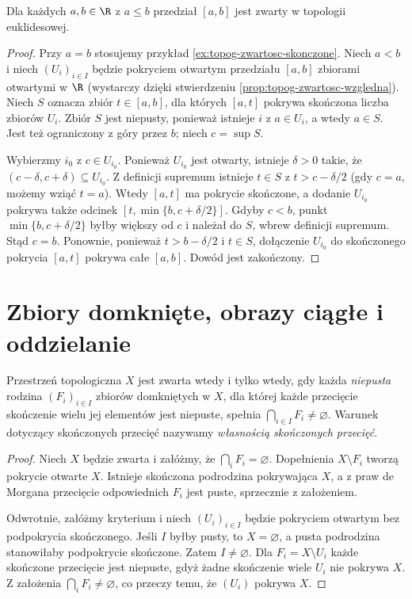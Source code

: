 \begin{twierdzenie}
\label{thm:topog-zwartosc-odcinek}
Dla każdych $a,b\in\R$ z $a\le b$ przedział $[a,b]$
jest zwarty w topologii euklidesowej.
\end{twierdzenie}
\begin{proof}
Przy $a=b$ stosujemy przykład
\ref{ex:topog-zwartosc-skonczone}. Niech $a<b$
i niech $(U_i)_{i\in I}$ będzie pokryciem
otwartym przedziału $[a,b]$ zbiorami otwartymi
w $\R$ (wystarczy dzięki stwierdzeniu
\ref{prop:topog-zwartosc-wzgledna}).
Niech $S$ oznacza zbiór $t\in[a,b]$, dla których
$[a,t]$ pokrywa skończona liczba zbiorów $U_i$.
Zbiór $S$ jest niepusty, ponieważ istnieje $i$
z $a\in U_i$, a wtedy $a\in S$.
Jest też ograniczony z góry przez $b$; niech $c=\sup S$.

Wybierzmy $i_0$ z $c\in U_{i_0}$. Ponieważ $U_{i_0}$
jest otwarty, istnieje $\delta>0$ takie, że
$(c-\delta,c+\delta)\subseteq U_{i_0}$.
Z definicji supremum istnieje $t\in S$ z
$t>c-\delta/2$ (gdy $c=a$, możemy wziąć $t=a$).
Wtedy $[a,t]$ ma pokrycie skończone, a dodanie
$U_{i_0}$ pokrywa także odcinek
$[t,\min\{b,c+\delta/2\}]$.
Gdyby $c<b$, punkt $\min\{b,c+\delta/2\}$
byłby większy od $c$ i należał do $S$, wbrew
definicji supremum. Stąd $c=b$. Ponownie,
ponieważ $t> b-\delta/2$ i $t\in S$, dołączenie
$U_{i_0}$ do skończonego pokrycia $[a,t]$
pokrywa całe $[a,b]$. Dowód jest zakończony.
\end{proof}

\section{Zbiory domknięte, obrazy ciągłe i oddzielanie}
\label{sec:topog-zwartosc-podstawowe-wlasnosci}

\begin{twierdzenie}
\label{thm:topog-zwartosc-fip}
Przestrzeń topologiczna $X$ jest zwarta wtedy i tylko
wtedy, gdy każda \emph{niepusta} rodzina $(F_i)_{i\in I}$
zbiorów domkniętych w $X$, dla której każde
przecięcie skończenie wielu jej elementów jest
niepuste, spełnia $\bigcap_{i\in I}F_i\ne\varnothing$.
Warunek dotyczący skończonych przecięć nazywamy
\emph{własnością skończonych przecięć}.
\end{twierdzenie}
\begin{proof}
Niech $X$ będzie zwarta i załóżmy, że
$\bigcap_i F_i=\varnothing$. Dopełnienia $X\setminus F_i$
tworzą pokrycie otwarte $X$. Istnieje skończona
podrodzina pokrywająca $X$, a z praw de Morgana
przecięcie odpowiednich $F_i$ jest puste,
sprzecznie z założeniem.

Odwrotnie, załóżmy kryterium i niech $(U_i)_{i\in I}$
będzie pokryciem otwartym bez podpokrycia skończonego.
Jeśli $I$ byłby pusty, to $X=\varnothing$, a pusta
podrodzina stanowiłaby podpokrycie skończone.
Zatem $I\ne\varnothing$. Dla $F_i=X\setminus U_i$
każde skończone przecięcie jest niepuste,
gdyż żadne skończenie wiele $U_i$ nie pokrywa $X$.
Z założenia $\bigcap_i F_i\ne\varnothing$, co przeczy
temu, że $(U_i)$ pokrywa $X$.
\end{proof}

